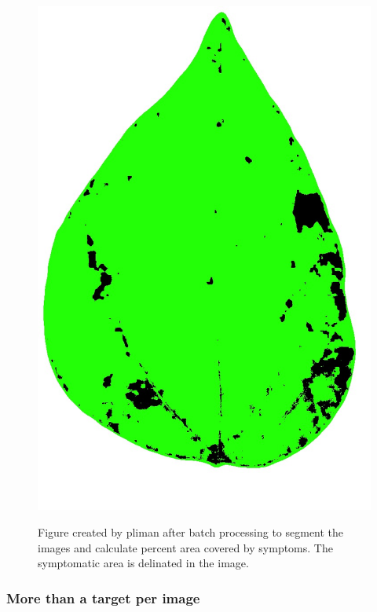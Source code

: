 \documentclass[
  letterpaper,
]{book}
\begin{document}
\begin{figure}

{\centering 

\href{fig_proc1}{\includegraphics[width=4.70833in,height=\textheight]{imgs/processed/proc_img46.jpg}}

}

\caption{\label{fig-processed}Figure created by pliman after batch
processing to segment the images and calculate percent area covered by
symptoms. The symptomatic area is delinated in the image.}

\end{figure}

\hypertarget{more-than-a-target-per-image}{%
\subsubsection{More than a target per
image}\label{more-than-a-target-per-image}}
\end{document}
